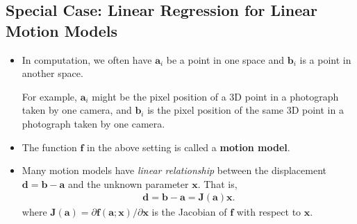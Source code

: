 \documentclass[10pt]{article}
\newcommand{\ve}[1]{\mathbf{#1}}
\begin{document}
  \subsection{Special Case: Linear Regression for Linear Motion Models}
  \label{linear-motion-model}
  \begin{itemize}
    \item In computation, we often have $\ve{a}_i$ be a point
      in one space and $\ve{b}_i$ is a point in another space.
      
      For example, $\ve{a}_i$ might be the pixel position of a 3D
      point in a photograph taken by one camera, and $\ve{b}_i$ is
      the pixel position of the same 3D point in a photograph
      taken by one camera.
      
    \item The function $\ve{f}$ in the above setting is called
      a {\bf motion model}.
      
	  \item Many motion models have \emph{linear relationship} between 
	  the displacement $\ve{d}	= \ve{b} - \ve{a}$ and the unknown 
	  parameter $\ve{x}$.
	  That is,
	  \begin{align*}
	    \ve{d} = \ve{b} - \ve{a} = \ve{J}(\ve{a}) \ve{x}.
	  \end{align*}
	  where $\ve{J}(\ve{a}) = 
	  \partial \ve{f}(\ve{a};\ve{x}) / \partial \ve{x}$ 
	  is the Jacobian of $\ve{f}$ with respect to $\ve{x}$.
	  

\end{itemize}
\end{document}
